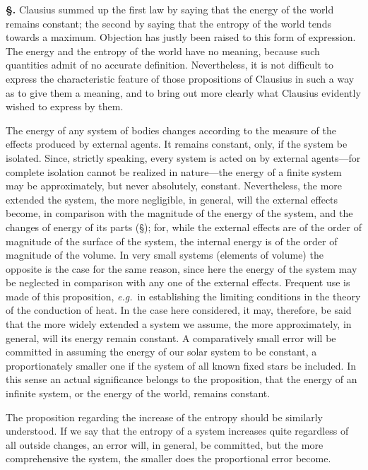 \documentclass[12pt]{book}[2005/09/16]
\newcommand{\Section}[1]{
  \medskip\par\textbf{§\;#1}
  \label{section:#1}
}
\newcommand{\SecRef}[2][§\;]{\hyperref[section:#2.]{{\upshape #1#2}}}
\newcommand{\PageSep}[1]{\ignorespaces}
\newcommand{\eg}{\emph{e.g.}}
\begin{document}
\Section{135.} Clausius summed up the first law by saying that
%
the energy of the world remains constant; the second by
saying that the entropy of the world tends towards a
maximum. Objection has justly been raised to this form
of expression. The energy and the entropy of the world
have no meaning, because such quantities admit of no
accurate definition. Nevertheless, it is not difficult to
\PageSep{102}
express the characteristic feature of those propositions of
Clausius in such a way as to give them a meaning, and to
bring out more clearly what Clausius evidently wished to
express by them.

The energy of any system of bodies changes according
to the measure of the effects produced by external agents.
It remains constant, only, if the system be isolated. Since,
strictly speaking, every system is acted on by external
agents---for complete isolation cannot be realized in nature---the
energy of a finite system may be approximately, but
never absolutely, constant. Nevertheless, the more extended
the system, the more negligible, in general, will the
external effects become, in comparison with the magnitude
of the energy of the system, and the changes of energy of its
parts (\SecRef{55}); for, while the external effects are of the order of
magnitude of the surface of the system, the internal energy
is of the order of magnitude of the volume. In very small
systems (elements of volume) the opposite is the case for
the same reason, since here the energy of the system may
be neglected in comparison with any one of the external
effects. Frequent use is made of this proposition, \eg\ in
establishing the limiting conditions in the theory of the conduction
of heat. In the case here considered, it may, therefore,
be said that the more widely extended a system we
assume, the more approximately, in general, will its energy
remain constant. A comparatively small error will be committed
in assuming the energy of our solar system to be
constant, a proportionately smaller one if the system of all
known fixed stars be included. In this sense an actual
significance belongs to the proposition, that the energy
of an infinite system, or the energy of the world, remains
constant.

The proposition regarding the increase of the entropy
should be similarly understood. If we say that the entropy
of a system increases quite regardless of all outside
changes, an error will, in general, be committed, but the
more comprehensive the system, the smaller does the proportional
error become.
\PageSep{103}
\end{document}
